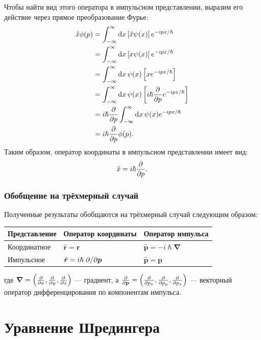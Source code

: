 \documentclass[a4paper, 12pt]{article}
\begin{document}
Чтобы найти вид этого оператора в импульсном представлении, выразим его действие через прямое преобразование Фурье:
\begin{align}
    \hat{x} \phi(p) &= \int_{-\infty}^{\infty} \dd{x} \left[\hat{x} \psi(x)\right] e^{-i p x / \hslash} \nonumber \\
                    &= \int_{-\infty}^{\infty} \dd{x} \left[x \psi(x)\right] e^{-i p x / \hslash} \nonumber \\
                    &= \int_{-\infty}^{\infty} \dd{x} \psi(x) \left[x e^{-i p x / \hslash}\right] \nonumber \\
                    &= \int_{-\infty}^{\infty} \dd{x} \psi(x) \left[i\hslash \pdv{p} e^{-i p x / \hslash}\right] \nonumber \\
                    &= i\hslash \pdv{p} \int_{-\infty}^{\infty} \dd{x} \psi(x) e^{-i p x / \hslash} \nonumber \\
                    &= i\hslash \pdv{p} \phi(p).
\end{align}
Таким образом, оператор координаты в импульсном представлении имеет вид:
\begin{equation}
    \hat{x} = i \hslash \pdv{p}. \label{eq:x_in_p_rep}
\end{equation}

\subsubsection*{Обобщение на трёхмерный случай}

Полученные результаты обобщаются на трёхмерный случай следующим образом:

\begin{center}
\begin{tabular}{lll}
\hline
Представление & Оператор координаты & Оператор импульса \\
\hline
Координатное & $\hat{\bm{r}} = \bm{r}$ & $\hat{\bm{p}} = -i\hslash \bm{\nabla}$ \\
Импульсное & $\hat{\bm{r}} = i\hslash \pdv*{\bm{p}}$ & $\hat{\bm{p}} = \bm{p}$ \\
\hline
\end{tabular}
\end{center}

где $\bm{\nabla} = \left( \pdv{x}, \pdv{y}, \pdv{z} \right)$ --- градиент, а
$\pdv{\bm{p}} = \left( \pdv{p_x}, \pdv{p_y}, \pdv{p_z} \right)$ --- векторный оператор
дифференцирования по компонентам импульса.

\section{Уравнение Шредингера}
\end{document}
